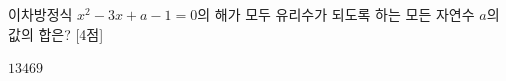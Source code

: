이차방정식 $x^2-3x+a-1=0$의 해가 모두 유리수가 되도록 하는 모든 자연수 $a$의 값의 합은? \mbox{[4점]}
\begin{choices32}{$1$}{$3$}{$4$}{$6$}{$9$}\end{choices32}
